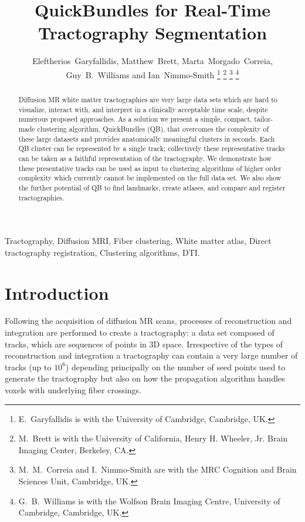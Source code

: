 \documentclass[journal]{IEEEtran}
\begin{document}

\title{QuickBundles for Real-Time Tractography Segmentation}

\author{Eleftherios~Garyfallidis, Matthew~Brett, Marta~Morgado~Correia, Guy~B.~Williams and Ian~Nimmo-Smith%
\thanks{E.~Garyfallidis is with the University of Cambridge, Cambridge, UK.}%
\thanks{M.~Brett is with the University of California, Henry H. Wheeler, Jr. Brain Imaging Center, Berkeley, CA.}%
\thanks{M.~M.~Correia and I.~Nimmo-Smith are with the MRC Cognition and Brain Sciences Unit, Cambridge, UK.}%
\thanks{G.~B.~Williams is with the Wolfson Brain Imaging Centre, University of Cambridge, Cambridge, UK.}}

\maketitle

\begin{abstract}
  Diffusion MR white matter tractographies are very large data sets
  which are hard to visualize, interact with, and interpret in a
  clinically acceptable time scale, despite numerous proposed
  approaches. As a solution we present a simple, compact, tailor-made
  clustering algorithm, QuickBundles (QB), that overcomes the complexity
  of these large datasets and provides anatomically meaningful clusters
  in seconds. Each QB cluster can be represented by a single track;
  collectively these representative tracks can be taken as a faithful
  representation of the tractography. We demonstrate how these presentative
  tracks can be used as input to clustering algorithms of higher
  order complexity which currently cannot be implemented on the full
  data set. We also show the further potential of QB to find landmarks,
  create atlases, and compare and register tractographies.
\end{abstract}

\begin{IEEEkeywords}
  Tractography, Diffusion MRI, Fiber clustering, White matter atlas,
  Direct tractography registration, Clustering algorithms, DTI.
\end{IEEEkeywords}

\section{Introduction}

Following the acquisition of diffusion MR scans, processes of
reconstruction and integration are performed to
create a tractography: a data set composed of tracks, which are
sequences of points in 3D space. Irrespective of the types of
reconstruction and integration a tractography can contain a very large
number of tracks (up to $10^6$) depending principally on the number of
seed points used to generate the tractography but also on how the
propagation algorithm handles voxels with underlying fiber crossings.
\end{document}
